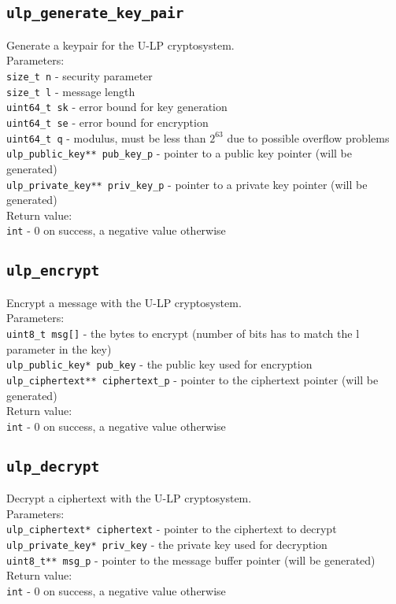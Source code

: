 \documentclass[10pt,a4paper]{article}
\begin{document}
\subsection*{\texttt{ulp\_generate\_key\_pair}}
Generate a keypair for the U-LP cryptosystem.\\
Parameters:\\
\texttt{size\_t n} - security parameter\\
\texttt{size\_t l} - message length\\
\texttt{uint64\_t sk} - error bound for key generation\\
\texttt{uint64\_t se} - error bound for encryption\\
\texttt{uint64\_t q} - modulus, must be less than $2^{63}$ due to possible overflow problems\\
\texttt{ulp\_public\_key** pub\_key\_p} - pointer to a public key pointer (will be generated)\\
\texttt{ulp\_private\_key** priv\_key\_p} - pointer to a private key pointer (will be generated)\\
Return value:\\
\texttt{int} - 0 on success, a negative value otherwise

\subsection*{\texttt{ulp\_encrypt}}
Encrypt a message with the U-LP cryptosystem.\\
Parameters:\\
\texttt{uint8\_t msg[]} - the bytes to encrypt (number of bits has to match the l parameter in the key)\\
\texttt{ulp\_public\_key* pub\_key} - the public key used for encryption\\
\texttt{ulp\_ciphertext** ciphertext\_p} - pointer to the ciphertext pointer (will be generated)\\
Return value:\\
\texttt{int} - 0 on success, a negative value otherwise

\subsection*{\texttt{ulp\_decrypt}}
Decrypt a ciphertext with the U-LP cryptosystem.\\
Parameters:\\
\texttt{ulp\_ciphertext* ciphertext} - pointer to the ciphertext to decrypt\\
\texttt{ulp\_private\_key* priv\_key} - the private key used for decryption\\
\texttt{uint8\_t** msg\_p} - pointer to the message buffer pointer (will be generated)\\
Return value:\\
\texttt{int} - 0 on success, a negative value otherwise
\end{document}
